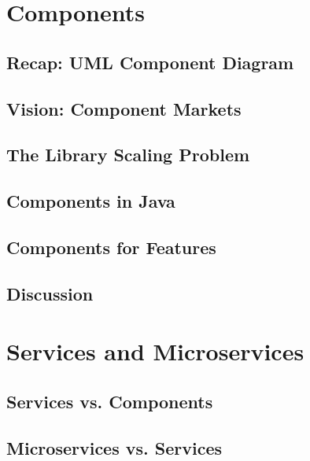\documentclass[
	aspectratio=169, %
	8pt, %
	handout, %
]{beamer}
\subtitle{6. Modular Features}
\author{Timo Kehrer}
\begin{document}


\section{Components}


\subsection{Recap: UML Component Diagram}
\subsection{Vision: Component Markets}
\subsection{The Library Scaling Problem}
\subsection{Components in Java}
\subsection{Components for Features}
\subsection{Discussion}

\lessonslearned{
	\item \ldots
}{
	\item \ldots
}{
	\ldots
}

\sectionend

\section{Services and Microservices}

\subsection{Services vs. Components}
\subsection{Microservices vs. Services}

\lessonslearned{
	\item \ldots
}{
	\item \ldots
}{
	\ldots
}
\end{document}
